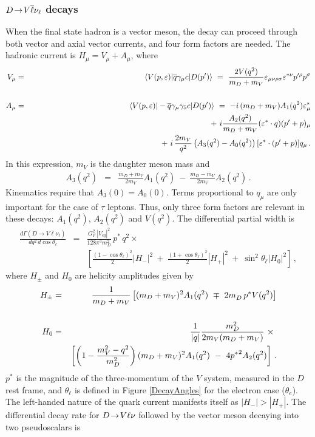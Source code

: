 \subsubsection{$D\!\rightarrow\! V\overline \ell \nu_\ell$ decays}

When the final state hadron is a vector meson, the decay can proceed through
both vector and axial vector currents, and four form factors are needed.
The hadronic current is $H^{}_\mu = V^{}_\mu + A^{}_\mu$, 
where~\cite{Gilman:1989uy} 
\begin{eqnarray}
V_\mu & = & \left< V(p,\varepsilon) | \bar{q}\gamma_\mu c | D(p') \right> \ =\  
\frac{2V(q^2)}{m_D+m_V} 
\varepsilon_{\mu\nu\rho\sigma}\varepsilon^{*\nu}p^{\prime\rho}p^\sigma \\
 & & \nonumber\\
A_\mu & = & \left< V(p,\varepsilon) | -\bar{q}\gamma_\mu\gamma_5 c | D(p') \right> 
 \ =\  -i\,(m_D+m_V)A_1(q^2)\varepsilon^*_\mu \nonumber \\
 & & \hskip2.10in 
  +\ i \frac{A_2(q^2)}{m_D+m_V}(\varepsilon^*\cdot q)(p' + p)_\mu \nonumber \\
 & & \hskip2.30in 
+\ i\,\frac{2m_V}{q^2}\left(A_3(q^2)-A_0(q^2)\right)[\varepsilon^*\cdot (p' + p)] q_\mu\,.
\end{eqnarray}
In this expression, $m_V$ is the daughter meson mass and
\begin{eqnarray}A_3(q^2) & = & \frac{m_D + m_V}{2m_V}A_1(q^2)\ -\ \frac{m_D - m_V}{2m_V}A_2(q^2)\,.
\end{eqnarray}
Kinematics require that $A_3(0) = A_0(0)$. Terms proportional to $q_\mu$ are only important 
for the case of $\tau$ leptons. Thus, only three form factors are relevant in these decays: 
$A_1(q^2)$, $A_2(q^2)$ and $V(q^2)$. The differential partial width is
\begin{eqnarray}
\frac{d\Gamma(D \to V \overline \ell \nu_\ell)}{dq^2\, d\cos\theta_\ell} & = & 
  \frac{G_F^2\,|V_{cq}|^2}{128\pi^3m_D^2}\,p^*\,q^2 \times \nonumber \\
 & &  
\left[\frac{(1-\cos\theta_\ell)^2}{2}|H_-|^2\ +\  
\frac{(1+\cos\theta_\ell)^2}{2}|H_+|^2\ +\ \sin^2\theta_\ell|H_0|^2\right]\,,
\end{eqnarray}
where $H^{}_\pm$ and $H^{}_0$ are helicity amplitudes given by
\begin{eqnarray}
H_\pm & = & \frac{1}{m_D + m_V}\left[(m_D+m_V)^2A_1(q^2)\ \mp\ 
      2m^{}_D\,p^* V(q^2)\right] \\
 & & \nonumber \\
H_0 & = & \frac{1}{|q|}\frac{m_D^2}{2m_V(m_D + m_V)}\ \times\ \nonumber \\
 & & \hskip0.01in \left[
    \left(1- \frac{m_V^2 - q^2}{m_D^2}\right)(m_D + m_V)^2 A_1(q^2) 
    \ -\ 4{p^*}^2 A_2(q^2) \right]\,.
\label{HelDef}
\end{eqnarray}
$p^*$ is the magnitude of the three-momentum of the $V$ system, measured in the $D$ rest frame, and $\theta_\ell$ is 
defined in Figure \ref{DecayAngles} for the electron case ($\theta_e$).
The left-handed nature of the quark current manifests itself as
$|H_-|>|H_+|$. The differential decay rate for $D\!\rightarrow\! V\ell\nu$ 
followed by the vector meson decaying into two pseudoscalars is


